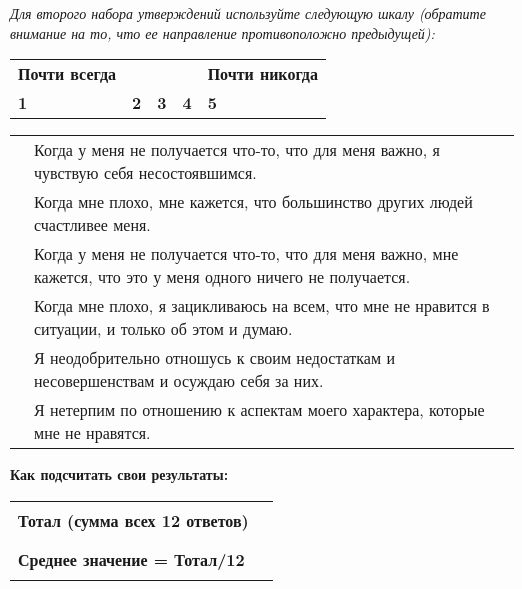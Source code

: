 \newpage

\textit{Для второго набора утверждений используйте следующую шкалу (обратите внимание на то, что ее направление противоположно предыдущей):}

\begin{flushright}
	\setlength{\extrarowheight}{2mm}
	\begin{tabularx}{12cm}{XXXXX}
		\textbf{Почти всегда} & & & & \textbf{Почти никогда} \\
		\textbf{1} & \textbf{2} & \textbf{3} & \textbf{4} & \textbf{5} \\
	\end{tabularx}
	\setlength{\extrarowheight}{0mm}
\end{flushright}

\begin{center}
	\setlength{\extrarowheight}{2mm}
	\begin{tabularx}{\textwidth}{p{1.7cm}X}
		\noindent\rule{1.7cm}{0.4pt} & Когда у меня не получается что-то, что для меня важно, я чувствую себя несостоявшимся. \\
		\noindent\rule{1.7cm}{0.4pt} & Когда мне плохо, мне кажется, что большинство других людей счастливее меня. \\
		\noindent\rule{1.7cm}{0.4pt} & Когда у меня не получается что-то, что для меня важно, мне кажется, что это у меня одного ничего не получается. \\
		\noindent\rule{1.7cm}{0.4pt} & Когда мне плохо, я зацикливаюсь на всем, что мне не нравится в ситуации, и только об этом и думаю. \\
		\noindent\rule{1.7cm}{0.4pt} & Я неодобрительно отношусь к своим недостаткам и несовершенствам и осуждаю себя за них. \\
		\noindent\rule{1.7cm}{0.4pt} & Я нетерпим по отношению к аспектам моего характера, которые мне не нравятся. \\
	\end{tabularx}
	\setlength{\extrarowheight}{0mm}	
\end{center}

\vspace{5ex}

\noindent\textbf{Как подсчитать свои результаты:}

\begin{flushright}
	\setlength{\extrarowheight}{5mm}
	\begin{tabularx}{11.5cm}{ll}
		\textbf{Тотал (сумма всех 12 ответов)} & \rule{1.7cm}{0.4pt} \\
		\textbf{Среднее значение = Тотал/12} & \rule{1.7cm}{0.4pt}
	\end{tabularx}
	\setlength{\extrarowheight}{0mm}
\end{flushright}

